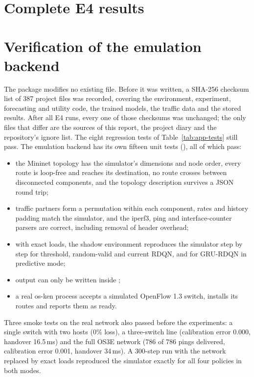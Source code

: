 \section{Complete E4 results}



\section{Verification of the emulation backend}

The package  modifies no existing file. Before it was written, a SHA-256 checksum list of 387 project files was recorded, covering the environment, experiment, forecasting and utility code, the trained models, the traffic data and the stored results. After all E4 runs, every one of those checksums was unchanged; the only files that differ are the sources of this report, the project diary and the repository's ignore list. The eight regression tests of Table~\ref{tab:app-tests} still pass. The emulation backend has its own fifteen unit tests (), all of which pass:
\begin{itemize}[leftmargin=*]
  \item the Mininet topology has the simulator's dimensions and node order, every route is loop-free and reaches its destination, no route crosses between disconnected components, and the topology description survives a JSON round trip;
  \item traffic partners form a permutation within each component, rates and history padding match the simulator, and the iperf3, ping and interface-counter parsers are correct, including removal of header overhead;
  \item with exact loads, the shadow environment reproduces the simulator step by step for threshold, random-valid and current RDQN, and for GRU-RDQN in predictive mode;
  \item output can only be written inside ;
  \item a real os-ken process accepts a simulated OpenFlow 1.3 switch, installs its routes and reports them as ready.
\end{itemize}
Three smoke tests on the real network also passed before the experiments: a single switch with two hosts (0\% loss), a three-switch line (calibration error 0.000, handover 16.5\,ms) and the full OS3E network (786 of 786 pings delivered, calibration error 0.001, handover 34\,ms). A 300-step run with the network replaced by exact loads reproduced the simulator exactly for all four policies in both modes.

